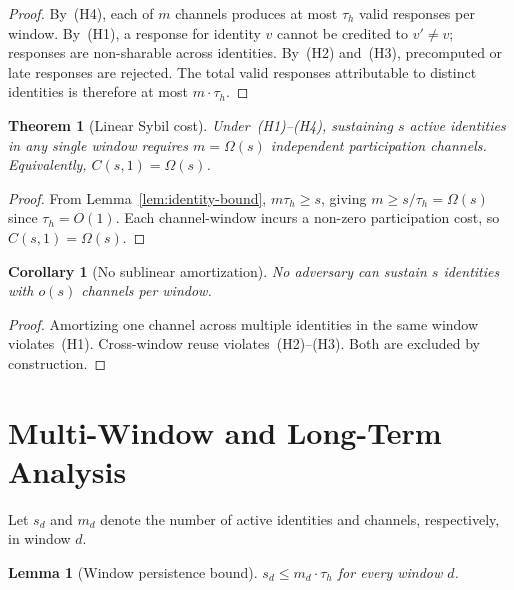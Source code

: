\documentclass[11pt]{article}
\newtheorem{theorem}{Theorem}
\newtheorem{lemma}{Lemma}
\newtheorem{corollary}{Corollary}
\theoremstyle{remark}
\theoremstyle{plain}
\begin{document}
	\begin{proof}
		By~(H4), each of $m$ channels produces at most $\tau_h$ valid
		responses per window. By~(H1), a response for identity $v$ cannot
		be credited to $v' \neq v$; responses are non-sharable across
		identities. By~(H2) and~(H3), precomputed or late responses are
		rejected. The total valid responses attributable to distinct identities
		is therefore at most $m \cdot \tau_h$.
	\end{proof}
	
	\begin{theorem}[Linear Sybil cost]
		\label{thm:linear-cost}
		Under~(H1)--(H4), sustaining $s$ active identities in any single
		window requires $m = \Omega(s)$ independent participation channels.
		Equivalently, $C(s, 1) = \Omega(s)$.
	\end{theorem}
	
	\begin{proof}
		From Lemma~\ref{lem:identity-bound}, $m\tau_h \ge s$, giving
		$m \ge s/\tau_h = \Omega(s)$ since $\tau_h = O(1)$. Each channel-window
		incurs a non-zero participation cost, so $C(s,1) = \Omega(s)$.
	\end{proof}
	
	\begin{corollary}[No sublinear amortization]
		No adversary can sustain $s$ identities with $o(s)$ channels per window.
	\end{corollary}
	
	\begin{proof}
		Amortizing one channel across multiple identities in the same window
		violates~(H1). Cross-window reuse violates~(H2)--(H3). Both are
		excluded by construction.
	\end{proof}
	
	
	\section{Multi-Window and Long-Term Analysis}
	\label{sec:multiwindow}
	
	Let $s_d$ and $m_d$ denote the number of active identities and channels,
	respectively, in window $d$.
	
	\begin{lemma}[Window persistence bound]
		\label{lem:persistence}
		$s_d \le m_d \cdot \tau_h$ for every window $d$.
	\end{lemma}
	
\end{document}
